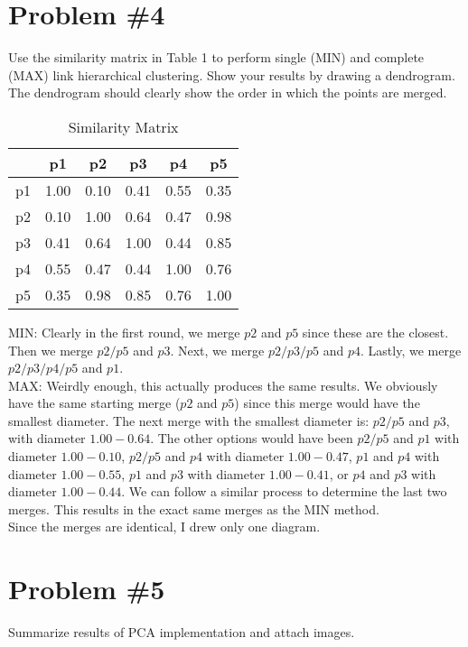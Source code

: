 \documentclass[12pt]{article}
\begin{document}
	\section*{Problem \#4}
	Use the similarity matrix in Table 1 to perform single
	(MIN) and complete (MAX) link hierarchical clustering. Show your results by drawing a
	dendrogram. The dendrogram should clearly show the order in which the points are merged.
	\begin{table}[H]
		\centering
		\caption{Similarity Matrix}
		\begin{tabular}{c|c|c|c|c|c}
			& \textbf{p1} & \textbf{p2} & \textbf{p3} & \textbf{p4} & \textbf{p5} \\
			\hline
			p1 & 1.00 & 0.10 & 0.41 & 0.55 & 0.35 \\
			p2 & 0.10 & 1.00 & 0.64 & 0.47 & 0.98 \\
			p3 & 0.41 & 0.64 & 1.00 & 0.44 & 0.85 \\
			p4 & 0.55 & 0.47 & 0.44 & 1.00 & 0.76 \\
			p5 & 0.35 & 0.98 & 0.85 & 0.76 & 1.00 \\
			\hline
		\end{tabular}
	\end{table}
	MIN: Clearly in the first round, we merge $p2$ and $p5$ since these are the closest. Then we merge $p2/p5$ and $p3$. Next, we merge $p2/p3/p5$ and $p4$. Lastly, we merge $p2/p3/p4/p5$ and $p1$.
	\\
	MAX: Weirdly enough, this actually produces the same results. We obviously have the same starting merge ($p2$ and $p5$) since this merge would have the smallest diameter. The next merge with the smallest diameter is: $p2/p5$ and $p3$, with diameter $1.00-0.64$. The other options would have been $p2/p5$ and $p1$ with diameter $1.00-0.10$, $p2/p5$ and $p4$ with diameter $1.00-0.47$, $p1$ and $p4$ with diameter $1.00-0.55$, $p1$ and $p3$ with diameter $1.00-0.41$, or $p4$ and $p3$ with diameter $1.00-0.44$. We can follow a similar process to determine the last two merges. This results in the exact same merges as the MIN method.
	\\
	Since the merges are identical, I drew only one diagram.
	\section*{Problem \#5}
	Summarize results of PCA implementation and attach images.
	
	
	
\end{document}
